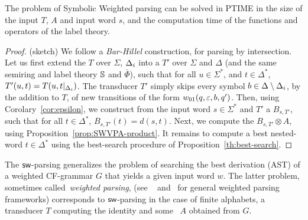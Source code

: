 %
%
\begin{proposition}
The problem of Symbolic Weighted  parsing
can be solved in PTIME in the size of the input \SWT $T$, \SWVPA $A$
and input word $s$,
and the computation time of the functions and operators of the label theory.
\end{proposition}
%
\begin{proof} (sketch)
We follow a \emph{Bar-Hillel} construction, for parsing by intersection.
%
\noindent
Let us first extend the \SWT $T$ over $\Sigma$, $\Deltai$
into a \SWT $T'$ over $\Sigma$ and $\Delta$
(and the same semiring and label theory $\mathbb{S}$ and $\bar\Phi$),
such that for all $u \in \Sigma^*$, and $t \in {\Delta}^*$,
$T'(u, t) = T(u, t|_{\Deltai})$.
%
The transducer $T'$ simply skips every symbol
$b \in {\Delta} \setminus \Deltai$,
by the addition to $T$,
of new transitions of the form $\wei_{01}(q, \varepsilon, b, q')$.
%
\noindent
Then, using Corolary~\ref{cor:epsilon},
we construct from the input word $s \in \Sigma^*$ and $T'$
a \SWA $B_{s, T'}$,
such that for all $t \in \Delta^*$, $B_{s, T'}(t) = d(s, t)$.
%
%
\noindent
Next, %
we compute the \SWVPA $B_{s, T'} \otimes A$,
using Proposition~\ref{prop:SWVPA-product}.
%
\noindent
It remains to compute a best nested-word $t \in {\Delta}^*$
using the best-search procedure of Proposition~\ref{th:best-search}.
\end{proof}
The $\textsf{sw}$-parsing generalizes
the problem of searching the best derivation (AST) of a weighted CF-grammar $G$
that yields a given input word $w$.
The latter problem, sometimes called~\emph{weighted parsing},
(see \eg~\cite{Goodman99SemiringParsing}
 and~\cite{MorbitzVogler19weighted-parsing} for general weighted parsing frameworks)
corresponds to $\textsf{sw}$-parsing in the case of finite alphabets,
a transducer $T$ computing the identity and some \SWVPA~$A$
obtained from $G$. %
%

